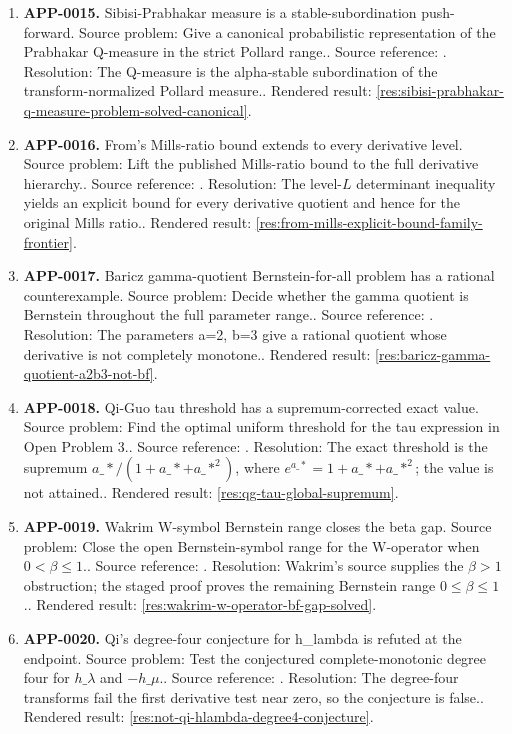 \begin{enumerate}[leftmargin=*]
\item \textbf{APP-0015.} Sibisi-Prabhakar measure is a stable-subordination push-forward.  Source problem: Give a canonical probabilistic representation of the Prabhakar Q-measure in the strict Pollard range.. Source reference: \cite{sibisi-prabhakar}. Resolution: The Q-measure is the alpha-stable subordination of the transform-normalized Pollard measure.. Rendered result: \ref{res:sibisi-prabhakar-q-measure-problem-solved-canonical}.
\item \textbf{APP-0016.} From's Mills-ratio bound extends to every derivative level.  Source problem: Lift the published Mills-ratio bound to the full derivative hierarchy.. Source reference: \cite{from-mills}. Resolution: The level-\(L\) determinant inequality yields an explicit bound for every derivative quotient and hence for the original Mills ratio.. Rendered result: \ref{res:from-mills-explicit-bound-family-frontier}.
\item \textbf{APP-0017.} Baricz gamma-quotient Bernstein-for-all problem has a rational counterexample.  Source problem: Decide whether the gamma quotient is Bernstein throughout the full parameter range.. Source reference: \cite{baricz-turan}. Resolution: The parameters a=2, b=3 give a rational quotient whose derivative is not completely monotone.. Rendered result: \ref{res:baricz-gamma-quotient-a2b3-not-bf}.
\item \textbf{APP-0018.} Qi-Guo tau threshold has a supremum-corrected exact value.  Source problem: Find the optimal uniform threshold for the tau expression in Open Problem 3.. Source reference: \cite{qi-guo-2004}. Resolution: The exact threshold is the supremum \(a\_*/(1+a\_*+a\_*^2)\), where \(e^{a\_*}=1+a\_*+a\_*^2\); the value is not attained.. Rendered result: \ref{res:qg-tau-global-supremum}.
\item \textbf{APP-0019.} Wakrim W-symbol Bernstein range closes the beta gap.  Source problem: Close the open Bernstein-symbol range for the W-operator when \(0<\beta\le1\).. Source reference: \cite{wakrim-w}. Resolution: Wakrim's source supplies the \(\beta>1\) obstruction; the staged proof proves the remaining Bernstein range \(0\le\beta\le1\).. Rendered result: \ref{res:wakrim-w-operator-bf-gap-solved}.
\item \textbf{APP-0020.} Qi's degree-four conjecture for h\_lambda is refuted at the endpoint.  Source problem: Test the conjectured complete-monotonic degree four for \(h\_\lambda\) and \(-h\_\mu\).. Source reference: \cite{qi-hlambda}. Resolution: The degree-four transforms fail the first derivative test near zero, so the conjecture is false.. Rendered result: \ref{res:not-qi-hlambda-degree4-conjecture}.

\end{enumerate}
